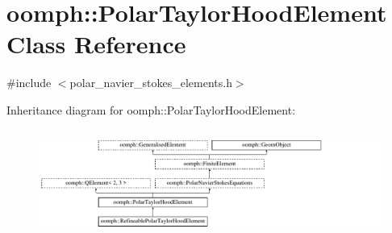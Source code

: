 \hypertarget{classoomph_1_1PolarTaylorHoodElement}{}\section{oomph\+:\+:Polar\+Taylor\+Hood\+Element Class Reference}
\label{classoomph_1_1PolarTaylorHoodElement}


{\ttfamily \#include $<$polar\+\_\+navier\+\_\+stokes\+\_\+elements.\+h$>$}

Inheritance diagram for oomph\+:\+:Polar\+Taylor\+Hood\+Element\+:\begin{figure}[H]
\begin{center}
\leavevmode
\includegraphics[height=3.548796cm]{classoomph_1_1PolarTaylorHoodElement}
\end{center}
\end{figure}
